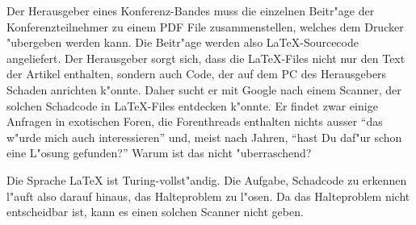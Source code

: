 Der Herausgeber eines Konferenz-Bandes muss die einzelnen Beitr"age der 
Konferenzteilnehmer zu einem PDF File zusammenstellen, welches dem Drucker
"ubergeben werden kann.
Die Beitr"age werden also \LaTeX-Sourcecode angeliefert.
Der Herausgeber sorgt sich, dass die \LaTeX-Files nicht nur den Text
der Artikel enthalten, sondern auch Code, der auf dem PC des Herausgebers
Schaden anrichten k"onnte.
Daher sucht er mit Google nach einem Scanner, der solchen Schadcode  in
\LaTeX-Files entdecken k"onnte.
Er findet zwar einige Anfragen in exotischen Foren, die Forenthreads
enthalten nichts ausser ``das w"urde mich auch interessieren'' und,
meist nach Jahren, ``hast Du daf"ur schon eine L"osung gefunden?''
Warum ist das nicht "uberraschend?

\begin{loesung}
Die Sprache \LaTeX{} ist Turing-vollst"andig.
Die Aufgabe, Schadcode zu erkennen l"auft also darauf hinaus, das Halteproblem
zu l"osen.
Da das Halteproblem nicht entscheidbar ist, kann es einen solchen Scanner
nicht geben.
\end{loesung}

